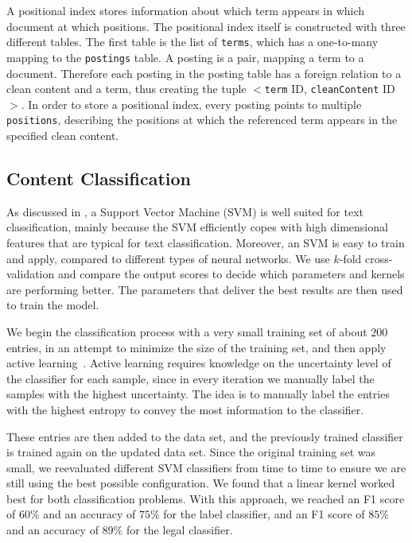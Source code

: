 A positional index stores information about which term appears in which document at which positions. The positional index itself is constructed with three different tables. The first table is the list of \texttt{terms}, which has a one-to-many mapping to the \texttt{postings} table. A posting is a pair, mapping a term to a document. Therefore each posting in the posting table has a foreign relation to a clean content and a term, thus creating the tuple $<$\texttt{term} ID, \texttt{cleanContent} ID$>$. In order to store a positional index, every posting points to multiple \texttt{positions}, describing the positions at which the referenced term appears in the specified clean content.

%
%
\subsection{Content Classification}
As discussed in \cite{Nabki2017,Verma2013}, a Support Vector Machine (SVM) is well suited for text classification, mainly because the SVM efficiently copes with high dimensional features that are typical for text classification. Moreover, an SVM is easy to train and apply, compared to different types of neural networks. We use $k$-fold cross-validation and compare the output scores to decide which parameters and kernels are performing better. The parameters that deliver the best results are then used to train the model.

We begin the classification process with a very small training set of about $200$ entries, in an attempt to minimize the size of the training set, and then apply active learning~\cite{Xu2009}. 
Active learning requires knowledge on the uncertainty level of the classifier for each sample, since in every iteration we manually label the samples with the highest uncertainty. The idea is to  manually label the entries with the highest entropy to convey the most information to the classifier.
 
 These entries are then added to the data set, and the previously trained classifier is trained again on the updated data set. Since the original training set was small, we reevaluated different SVM classifiers from time to time to ensure we are still using the best possible configuration. We found that a linear kernel worked best for both classification problems. With this approach, we reached an F1 score of $60\%$ and an accuracy of $75\%$ for the label classifier, and an F1 score of $85\%$ and an accuracy of $89\%$ for the legal classifier.

